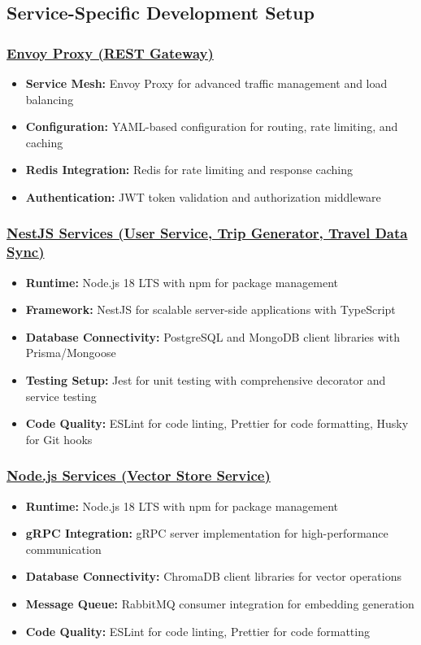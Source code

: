 \subsection{Service-Specific Development Setup}

\subsubsection*{\underline{Envoy Proxy (REST Gateway)}}
\begin{itemize}
    \item \textbf{Service Mesh:} Envoy Proxy for advanced traffic management and load balancing
    \item \textbf{Configuration:} YAML-based configuration for routing, rate limiting, and caching
    \item \textbf{Redis Integration:} Redis for rate limiting and response caching
    \item \textbf{Authentication:} JWT token validation and authorization middleware
\end{itemize}

\subsubsection*{\underline{NestJS Services (User Service, Trip Generator, Travel Data Sync)}}
\begin{itemize}
    \item \textbf{Runtime:} Node.js 18 LTS with npm for package management
    \item \textbf{Framework:} NestJS for scalable server-side applications with TypeScript
    \item \textbf{Database Connectivity:} PostgreSQL and MongoDB client libraries with Prisma/Mongoose
    \item \textbf{Testing Setup:} Jest for unit testing with comprehensive decorator and service testing
    \item \textbf{Code Quality:} ESLint for code linting, Prettier for code formatting, Husky for Git hooks
\end{itemize}

\subsubsection*{\underline{Node.js Services (Vector Store Service)}}
\begin{itemize}
    \item \textbf{Runtime:} Node.js 18 LTS with npm for package management
    \item \textbf{gRPC Integration:} gRPC server implementation for high-performance communication
    \item \textbf{Database Connectivity:} ChromaDB client libraries for vector operations
    \item \textbf{Message Queue:} RabbitMQ consumer integration for embedding generation
    \item \textbf{Code Quality:} ESLint for code linting, Prettier for code formatting
\end{itemize}

